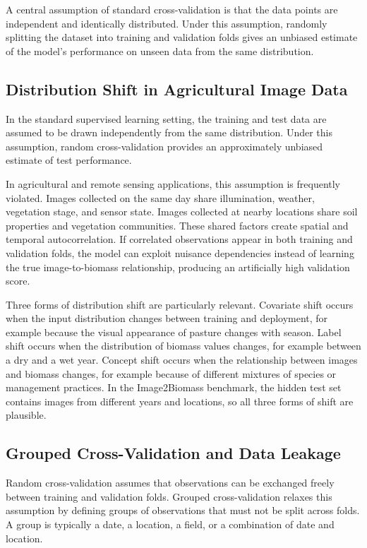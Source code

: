 A central assumption of standard cross-validation is that the data points are independent and identically distributed. Under this assumption, randomly splitting the dataset into training and validation folds gives an unbiased estimate of the model's performance on unseen data from the same distribution.

\subsection{Distribution Shift in Agricultural Image Data}

In the standard supervised learning setting, the training and test data are assumed to be drawn independently from the same distribution. Under this assumption, random cross-validation provides an approximately unbiased estimate of test performance.

In agricultural and remote sensing applications, this assumption is frequently violated. Images collected on the same day share illumination, weather, vegetation stage, and sensor state. Images collected at nearby locations share soil properties and vegetation communities. These shared factors create spatial and temporal autocorrelation. If correlated observations appear in both training and validation folds, the model can exploit nuisance dependencies instead of learning the true image-to-biomass relationship, producing an artificially high validation score.

Three forms of distribution shift are particularly relevant. Covariate shift occurs when the input distribution changes between training and deployment, for example because the visual appearance of pasture changes with season. Label shift occurs when the distribution of biomass values changes, for example between a dry and a wet year. Concept shift occurs when the relationship between images and biomass changes, for example because of different mixtures of species or management practices. In the Image2Biomass benchmark, the hidden test set contains images from different years and locations, so all three forms of shift are plausible.

\subsection{Grouped Cross-Validation and Data Leakage}

Random cross-validation assumes that observations can be exchanged freely between training and validation folds. Grouped cross-validation relaxes this assumption by defining groups of observations that must not be split across folds. A group is typically a date, a location, a field, or a combination of date and location.

